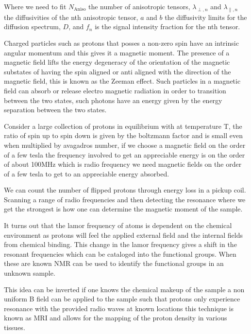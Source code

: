 Where we need to fit $N_\text{Aniso}$ the number of anisotropic tensors, $\lambda_{\perp, n}$ and $\lambda_{\parallel, n}$ the diffusivities of the nth anisotropic tensor, $a$ and $b$ the diffusivity limits for the diffusion spectrum, $D$, and $f_n$ is the signal intensity fraction for the nth tensor. \cite{wang2011quantification}














Charged particles such as protons that posses a non-zero spin have an intrinsic angular momentum and this gives it a magnetic moment. The presence of a magnetic field lifts the energy degeneracy of the orientation of the magnetic substates of having the spin aligned or anti aligned with the direction of the magnetic field, this is known as the Zeeman effect. Such particles in a magnetic field can absorb or release electro magnetic radiation in order to transition between the two states, such photons have an energy given by the energy separation between the two states.

Consider a large collection of protons in equilibrium with at temperature T, the ratio of spin up to spin down is given by the boltzmann factor and is small even when multiplied by avagadros number, if we choose a magnetic field on the order of a few tesla the frequency involved to get an appreciable energy is on the order of about 100MHz which is radio frequency we need magnetic fields on the order of a few tesla to get to an appreciable energy absorbed.

We can count the number of flipped protons through energy loss in a pickup coil. Scanning a range of radio frequencies and then detecting the resonance where we get the strongest is how one can determine the magnetic moment of the sample.

It turns out that the lamor frequency of atoms is dependent on the chemical environment as protons will feel the applied external field and the internal fields from chemical binding. This change in the lamor frequency gives a shift in the resonant frequencies which can be cataloged into the functional groups. When these are known NMR can be used to identify the functional groups in an unknown sample.

This idea can be inverted if one knows the chemical makeup of the sample a non uniform B field can be applied to the sample such that protons only experience resonance with the provided radio waves at known locations this technique is known as MRI and allows for the mapping of the proton density in various tissues.

